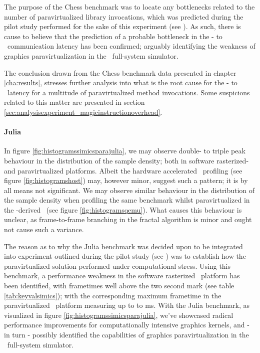 The purpose of the Chess benchmark was to locate any bottlenecks related to the number of paravirtualized library invocations, which was predicted during the pilot study performed for the sake of this experiment (see ).
As such, there is cause to believe that the prediction of a probable bottleneck in the \dvttermtarget - to \dvttermhost\ communication latency has been confirmed; arguably identifying the weakness of graphics paravirtualization in the \dvttermsimics\ full-system simulator.

The conclusion drawn from the Chess benchmark data presented in chapter \ref{cha:results}, stresses further analysis into what is the root cause for the \dvttermtarget - to \dvttermhost\ latency for a multitude of paravirtualized method invocations.
Some suspicions related to this matter are presented in section \ref{sec:analysisexperiment_magicinstructionoverhead}. 


\paragraph{Julia}
\label{par:analysisexperiment_julia}
In figure \ref{fig:histogramssimicsparajulia}, we may observe double- to triple peak behaviour in the distribution of the sample density; both in software rasterized- and paravirtualized platforms.
Albeit the hardware accelerated \dvttermhost\ profiling (see figure \ref{fig:histogramshost}) may, however minor, suggest such a pattern; it is by all means not significant.
We may observe similar behaviour in the distribution of the sample density when profiling the same benchmark whilst paravirtualized in the \dvttermqemu -derived \dvttermandroidemulator\ (see figure \ref{fig:histogramsqemu}).
What causes this behaviour is unclear, as frame-to-frame branching in the fractal algorithm is minor and ought not cause such a variance.

The reason as to why the Julia benchmark was decided upon to be integrated into experiment outlined during the pilot study (see ) was to establish how the paravirtualized solution performed under computational stress.
Using this benchmark, a performance weakness in the software rasterized \dvttermsimics\ platform has been identified, with frametimes well above the two second mark (see table \ref{tab:keyvalsimics}); with the corresponding maximum frametime in the paravirtualized \dvttermsimics\ platform measuring up to to  ms.
With the Julia benchmark, as visualized in figure \ref{fig:histogramssimicsparajulia}, we've showcased radical performance improvements for computationally intensive graphics kernels, and - in turn - possibly identified the capabilities of graphics paravirtualization in the \dvttermsimics\ full-system simulator.

